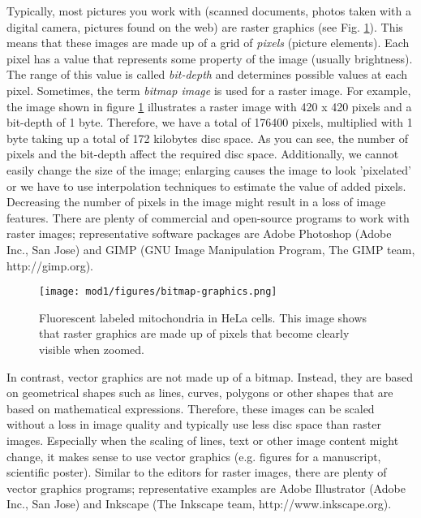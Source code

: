 Typically, most pictures you work with (scanned documents, photos taken with a digital camera, pictures found on the web) are raster graphics (see Fig. \ref{fig:bitmap-graphics}). This means that these images are made up of a grid of \emph{pixels} (picture elements). Each pixel has a value that represents some property of the image (usually brightness). The range of this value is called \emph{bit-depth} and determines possible values at each pixel. Sometimes, the term \emph{bitmap image} is used for a raster image. For example, the image shown in figure \ref{fig:bitmap-graphics} illustrates a raster image with 420 x 420 pixels and a bit-depth of 1 byte. Therefore, we have a total of 176400 pixels, multiplied with 1 byte taking up a total of 172 kilobytes disc space. As you can see, the number of pixels and the bit-depth affect the required disc space. Additionally, we cannot easily change the size of the image; enlarging causes the image to look 'pixelated' or we have to use interpolation techniques to estimate the value of added pixels. Decreasing the number of pixels in the image might result in a loss of image features. There are plenty of commercial and open-source programs to work with raster images; representative software packages are Adobe Photoshop (Adobe Inc., San Jose) and GIMP (GNU Image Manipulation Program, The GIMP team, http://gimp.org).

\begin{figure}[!ht]
	\centering
		\texttt{[image: mod1/figures/bitmap-graphics.png]}
	\caption{Fluorescent labeled mitochondria in HeLa cells. This image shows that raster graphics are made up of pixels that become clearly visible when zoomed.}
	\label{fig:bitmap-graphics}
\end{figure}


In contrast, vector graphics are not made up of a bitmap. Instead, they are based on geometrical shapes such as lines, curves, polygons or other shapes that are based on mathematical expressions. Therefore, these images can be scaled without a loss in image quality and typically use less disc space than raster images. Especially when the scaling of lines, text or other image content might change, it makes sense to use vector graphics (e.g. figures for a manuscript, scientific poster). Similar to the editors for raster images, there are plenty of vector graphics programs; representative examples are Adobe Illustrator (Adobe Inc., San Jose) and Inkscape (The Inkscape team, http://www.inkscape.org).

